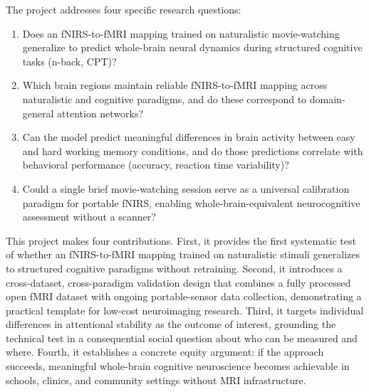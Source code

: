 The project addresses four specific research questions:

\begin{enumerate}
    \item[\textbf{RQ1:}] Does an fNIRS-to-fMRI mapping trained on naturalistic movie-watching generalize to predict whole-brain neural dynamics during structured cognitive tasks (n-back, CPT)?
    \item[\textbf{RQ2:}] Which brain regions maintain reliable fNIRS-to-fMRI mapping across naturalistic and cognitive paradigms, and do these correspond to domain-general attention networks?
    \item[\textbf{RQ3:}] Can the model predict meaningful differences in brain activity between easy and hard working memory conditions, and do those predictions correlate with behavioral performance (accuracy, reaction time variability)?
    \item[\textbf{RQ4:}] Could a single brief movie-watching session serve as a universal calibration paradigm for portable fNIRS, enabling whole-brain-equivalent neurocognitive assessment without a scanner?
\end{enumerate}

This project makes four contributions. First, it provides the first systematic test of whether an fNIRS-to-fMRI mapping trained on naturalistic stimuli generalizes to structured cognitive paradigms without retraining. Second, it introduces a cross-dataset, cross-paradigm validation design that combines a fully processed open fMRI dataset with ongoing portable-sensor data collection, demonstrating a practical template for low-cost neuroimaging research. Third, it targets individual differences in attentional stability as the outcome of interest, grounding the technical test in a consequential social question about who can be measured and where. Fourth, it establishes a concrete equity argument: if the approach succeeds, meaningful whole-brain cognitive neuroscience becomes achievable in schools, clinics, and community settings without MRI infrastructure.
